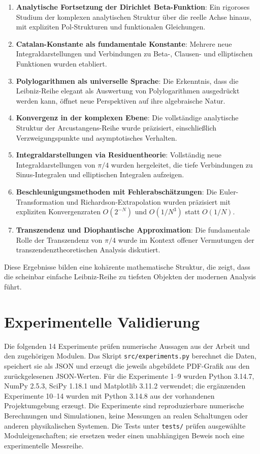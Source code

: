 \documentclass[a4paper,12pt,twoside]{report}
\theoremstyle{definition}
\begin{document}
\begin{enumerate}
	\item \textbf{Analytische Fortsetzung der Dirichlet Beta-Funktion}: Ein rigoroses Studium der komplexen analytischen Struktur über die reelle Achse hinaus, mit expliziten Pol-Strukturen und funktionalen Gleichungen.
	
	\item \textbf{Catalan-Konstante als fundamentale Konstante}: Mehrere neue Integraldarstellungen und Verbindungen zu Beta-, Clausen- und elliptischen Funktionen wurden etabliert.
	
	\item \textbf{Polylogarithmen als universelle Sprache}: Die Erkenntnis, dass die Leibniz-Reihe elegant als Auswertung von Polylogarithmen ausgedrückt werden kann, öffnet neue Perspektiven auf ihre algebraische Natur.
	
	\item \textbf{Konvergenz in der komplexen Ebene}: Die vollständige analytische Struktur der Arcustangens-Reihe wurde präzisiert, einschließlich Verzweigungspunkte und asymptotisches Verhalten.
	
	\item \textbf{Integraldarstellungen via Residuentheorie}: Vollständig neue Integraldarstellungen von $\pi/4$ wurden hergeleitet, die tiefe Verbindungen zu Sinus-Integralen und elliptischen Integralen aufzeigen.
	
	\item \textbf{Beschleunigungsmethoden mit Fehlerabschätzungen}: Die Euler-Transformation und Richardson-Extrapolation wurden präzisiert mit expliziten Konvergenzraten $O(2^{-N})$ und $O(1/N^3)$ statt $O(1/N)$.
	
	\item \textbf{Transzendenz und Diophantische Approximation}: Die fundamentale Rolle der Transzendenz von $\pi/4$ wurde im Kontext offener Vermutungen der transzendenztheoretischen Analysis diskutiert.
\end{enumerate}

Diese Ergebnisse bilden eine kohärente mathematische Struktur, die zeigt, dass die scheinbar einfache Leibniz-Reihe zu tiefsten Objekten der modernen Analysis führt.

\section{Experimentelle Validierung}

Die folgenden 14 Experimente prüfen numerische Aussagen aus der Arbeit und den zugehörigen Modulen. Das Skript \texttt{src/experiments.py} berechnet die Daten, speichert sie als JSON und erzeugt die jeweils abgebildete PDF-Grafik aus den zurückgelesenen JSON-Werten. Für die Experimente 1--9 wurden Python 3.14.7, NumPy 2.5.3, SciPy 1.18.1 und Matplotlib 3.11.2 verwendet; die ergänzenden Experimente 10--14 wurden mit Python 3.14.8 aus der vorhandenen Projektumgebung erzeugt. Die Experimente sind reproduzierbare numerische Berechnungen und Simulationen, keine Messungen an realen Schaltungen oder anderen physikalischen Systemen. Die Tests unter \texttt{tests/} prüfen ausgewählte Moduleigenschaften; sie ersetzen weder einen unabhängigen Beweis noch eine experimentelle Messreihe.
\end{document}
